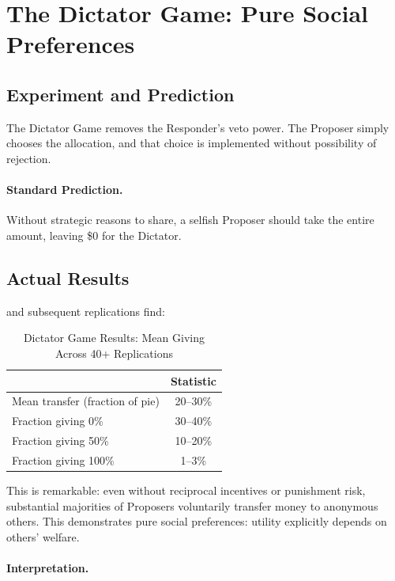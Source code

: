 \documentclass[12pt,oneside]{book}
\begin{document}
\section{The Dictator Game: Pure Social Preferences}

\subsection{Experiment and Prediction}

The Dictator Game removes the Responder's veto power. The Proposer simply chooses the allocation,
and that choice is implemented without possibility of rejection.

\paragraph{Standard Prediction.} Without strategic reasons to share, a selfish Proposer should take
the entire amount, leaving \$0 for the Dictator.

\subsection{Actual Results}

\citet{forsythe1994} and subsequent replications find:

\begin{table}[htbp]
\centering
\caption{Dictator Game Results: Mean Giving Across 40+ Replications}
\label{tab:dictator}
\begin{tabular}{@{}lc@{}}
\toprule
& \textbf{Statistic} \\
\midrule
Mean transfer (fraction of pie) & 20--30\% \\
Fraction giving 0\%              & 30--40\% \\
Fraction giving 50\%             & 10--20\% \\
Fraction giving 100\%            & 1--3\% \\
\bottomrule
\end{tabular}
\end{table}

This is remarkable: even without reciprocal incentives or punishment risk, substantial majorities
of Proposers voluntarily transfer money to anonymous others. This demonstrates pure social preferences:
utility explicitly depends on others' welfare.

\paragraph{Interpretation.}
\end{document}
